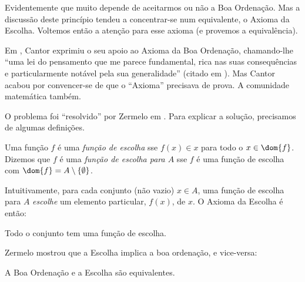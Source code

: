 \documentclass[../../../include/open-logic-section]{subfiles}
\begin{document}

Evidentemente que muito depende de aceitarmos ou não a Boa Ordenação. Mas
a discussão deste princípio tendeu a concentrar-se num equivalente,
o Axioma da Escolha. Voltemos então a atenção para esse axioma
(e provemos a equivalência). 

Em \citeyear{Cantor1883}, Cantor exprimiu o seu apoio ao Axioma
da Boa Ordenação, chamando-lhe ``uma lei do pensamento que me parece
fundamental, rica nas suas consequências e particularmente notável
pela sua generalidade'' (citado em \citeauthor{Potter2004}
\citeyear[p.~243]{Potter2004}). Mas Cantor acabou por convencer-se
de que o ``Axioma'' precisava de prova. A comunidade matemática
também. 

O problema foi ``resolvido'' por Zermelo em \citeyear{Zermelo1904}. Para
explicar a solução, precisamos de algumas definições. 

\begin{defn}
Uma função $f$ é uma \emph{função de escolha} sse $f(x) \in x$ para todo o $x \in \dom{f}$. Dizemos que $f$ é uma \emph{função de escolha para $A$} sse $f$ é uma função de escolha com $\dom{f} = A \setminus \{\emptyset\}$.
\end{defn}

Intuitivamente, para cada conjunto (não vazio) $x \in A$, uma função de escolha
para $A$ \emph{escolhe} um elemento particular, $f(x)$, de $x$. O
Axioma da Escolha é então:

\begin{axiom}[Escolha]
	Todo o conjunto tem uma função de escolha.
\end{axiom}

Zermelo mostrou que a Escolha implica a boa ordenação, e vice-versa:

\begin{thm}[em $\ZF$]
A Boa Ordenação e a Escolha são equivalentes.
\end{thm}
\end{document}
